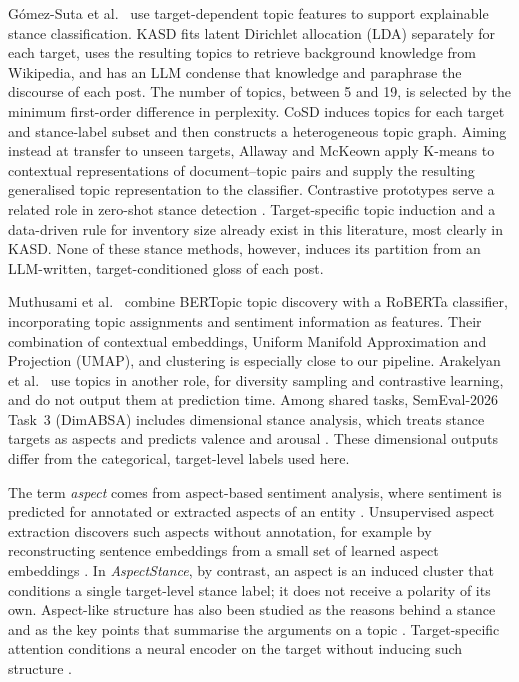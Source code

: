 \documentclass[pdflatex,sn-mathphys-num,iicol]{sn-jnl}%
\begin{document}
G\'omez-Suta et al.~\cite{gomez2023stance} use target-dependent topic features to support explainable stance classification. KASD \cite{li2023stance} fits latent Dirichlet allocation (LDA) \cite{blei2003latent} separately for each target, uses the resulting topics to retrieve background knowledge from Wikipedia, and has an LLM condense that knowledge and paraphrase the discourse of each post. The number of topics, between 5 and 19, is selected by the minimum first-order difference in perplexity. CoSD \cite{cheng2024cosd} induces topics for each target and stance-label subset and then constructs a heterogeneous topic graph. Aiming instead at transfer to unseen targets, Allaway and McKeown \cite{allaway2020zero} apply K-means to contextual representations of document--topic pairs and supply the resulting generalised topic representation to the classifier. Contrastive prototypes serve a related role in zero-shot stance detection \cite{liang2022jointcl}. Target-specific topic induction and a data-driven rule for inventory size already exist in this literature, most clearly in KASD. None of these stance methods, however, induces its partition from an LLM-written, target-conditioned gloss of each post.

Muthusami et al.~\cite{muthusami2025interpretable} combine BERTopic \cite{grootendorst2022bertopic} topic discovery with a RoBERTa classifier, incorporating topic assignments and sentiment information as features. Their combination of contextual embeddings, Uniform Manifold Approximation and Projection (UMAP), and clustering is especially close to our pipeline. Arakelyan et al.~\cite{arakelyan2023topic} use topics in another role, for diversity sampling and contrastive learning, and do not output them at prediction time. Among shared tasks, SemEval-2026 Task~3 (DimABSA) includes dimensional stance analysis, which treats stance targets as aspects and predicts valence and arousal \cite{yu2026dimabsa}. These dimensional outputs differ from the categorical, target-level labels used here.

The term \emph{aspect} comes from aspect-based sentiment analysis, where sentiment is predicted for annotated or extracted aspects of an entity \cite{pontiki2014semeval,zhang2023absasurvey}. Unsupervised aspect extraction discovers such aspects without annotation, for example by reconstructing sentence embeddings from a small set of learned aspect embeddings \cite{he2017unsupervised}. In \textit{AspectStance}, by contrast, an aspect is an induced cluster that conditions a single target-level stance label; it does not receive a polarity of its own. Aspect-like structure has also been studied as the reasons behind a stance \cite{hasan2014why} and as the key points that summarise the arguments on a topic \cite{barhaim2020keypoints}. Target-specific attention conditions a neural encoder on the target without inducing such structure \cite{du2017tan}.
\end{document}
